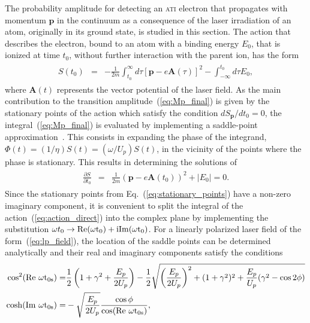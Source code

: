 The probability amplitude for detecting an \textsc{ati} electron that
propagates with momentum $\mathbf{p}$ in the continuum as a
consequence of the laser irradiation of an atom, originally in its
ground state, is studied in this section. The action that describes
the electron, bound to an atom with a binding energy $E_{0}$, that is
ionized at time $t_{0}$, without further interaction with the parent
ion, has the form
%
\begin{eqnarray}
  \label{eq:action_direct}
  \begin{split}
  S(t_{0}) & = &
-\frac{1}{2m}\int_{t_{0}}^{\infty}{d\tau [\mathbf{p} - e\mathbf{A}(\tau)]^{2}}
- \int_{-\infty}^{t_{0}}{d\tau E_{0}},
\end{split}
\end{eqnarray}
%
where $\mathbf{A}(t)$ represents the vector potential of the laser
field. As the main contribution to the transition
amplitude~(\ref{eq:Mp_final}) is given by the stationary points of the
action which satisfy the condition $dS_{\mathbf{p}} / dt_{0} = 0$, the
integral~(\ref{eq:Mp_final}) is evaluated by implementing a
saddle-point approximation~\cite{spa_1960}. This consists in expanding
the phase of the integrand, $\Phi(t) = (1/\eta) S(t) = (\omega /
U_{p}) S(t)$, in the vicinity of the points where the phase is
stationary. This results in determining the solutions of
%
\begin{eqnarray}
  \label{eq:stationary_points}
  \begin{split}
    \frac{\partial S}{\partial t_{0}} & = &
    \frac{1}{2m} (\mathbf{p} - e\mathbf{A}(t_{0}))^{2} + |E_{0}| = 0.
  \end{split}
\end{eqnarray}
%
Since the stationary points from Eq.~(\ref{eq:stationary_points}) have
a non-zero imaginary component, it is convenient to split the integral
of the action~(\ref{eq:action_direct}) into the complex plane by
implementing the substitution $\omega t_{0} \to \rm{Re}(\omega t_{0})
+ i\rm{Im}(\omega t_{0})$. For a linearly polarized laser field of the
form~(\ref{eq:lp_field}), the location of the saddle points can be
determined analytically and their real and imaginary components
satisfy the conditions
%
\begin{eqnarray}
  \label{eq:ReIm_eqs}
  \begin{split}
    \cos^{2}(\rm{Re}\ \omega t_{0s}) = & \frac{1}{2}
    \left( 1 + \gamma^{2} + \frac{E_{p}}{2U_{p}} \right)
    - \frac{1}{2}\sqrt{\left( \frac{E_{p}}{2U_{p}} \right)^{2}
    + (1 + \gamma^2)^2 + \frac{E_{p}}{U_{p}}(\gamma^2 - \cos 2\phi)}
    \\
    \cosh(\rm{Im}\ \omega t_{0s}) = & - \sqrt{\frac{E_{p}}{2U_{p}}}
    \frac{\cos\phi}{\cos(\rm{Re}\ \omega t_{0s})},
  \end{split}
\end{eqnarray}
